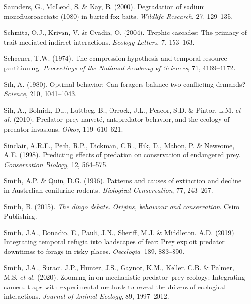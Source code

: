 \documentclass[11pt,a4paper,titlepage,twoside,openright]{style/unimelbthesis}
\begin{document}
\begin{mainmatter}
\leavevmode\hypertarget{ref-saunders2000degradation}{}%
Saunders, G., McLeod, S. \& Kay, B. (2000). Degradation of sodium monofluoroacetate (1080) in buried fox baits. \emph{Wildlife Research}, 27, 129--135.

\leavevmode\hypertarget{ref-schmitz2004trophic}{}%
Schmitz, O.J., Krivan, V. \& Ovadia, O. (2004). Trophic cascades: The primacy of trait-mediated indirect interactions. \emph{Ecology Letters}, 7, 153--163.

\leavevmode\hypertarget{ref-schoener1974compression}{}%
Schoener, T.W. (1974). The compression hypothesis and temporal resource partitioning. \emph{Proceedings of the National Academy of Sciences}, 71, 4169--4172.

\leavevmode\hypertarget{ref-sih1980optimal}{}%
Sih, A. (1980). Optimal behavior: Can foragers balance two conflicting demands? \emph{Science}, 210, 1041--1043.

\leavevmode\hypertarget{ref-sih2010predator}{}%
Sih, A., Bolnick, D.I., Luttbeg, B., Orrock, J.L., Peacor, S.D. \& Pintor, L.M. \emph{et al.} (2010). Predator--prey naïveté, antipredator behavior, and the ecology of predator invasions. \emph{Oikos}, 119, 610--621.

\leavevmode\hypertarget{ref-sinclair1998predicting}{}%
Sinclair, A.R.E., Pech, R.P., Dickman, C.R., Hik, D., Mahon, P. \& Newsome, A.E. (1998). Predicting effects of predation on conservation of endangered prey. \emph{Conservation Biology}, 12, 564--575.

\leavevmode\hypertarget{ref-smith1996patterns}{}%
Smith, A.P. \& Quin, D.G. (1996). Patterns and causes of extinction and decline in Australian conilurine rodents. \emph{Biological Conservation}, 77, 243--267.

\leavevmode\hypertarget{ref-smith2015dingo}{}%
Smith, B. (2015). \emph{The dingo debate: Origins, behaviour and conservation}. Csiro Publishing.

\leavevmode\hypertarget{ref-smith2019integrating}{}%
Smith, J.A., Donadio, E., Pauli, J.N., Sheriff, M.J. \& Middleton, A.D. (2019). Integrating temporal refugia into landscapes of fear: Prey exploit predator downtimes to forage in risky places. \emph{Oecologia}, 189, 883--890.

\leavevmode\hypertarget{ref-smith2020zooming}{}%
Smith, J.A., Suraci, J.P., Hunter, J.S., Gaynor, K.M., Keller, C.B. \& Palmer, M.S. \emph{et al.} (2020). Zooming in on mechanistic predator--prey ecology: Integrating camera traps with experimental methods to reveal the drivers of ecological interactions. \emph{Journal of Animal Ecology}, 89, 1997--2012.


\end{mainmatter}
\end{document}
